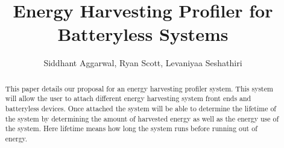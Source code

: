 \documentclass[10pt, sigconf ]{acmart}
\title{Energy Harvesting Profiler for Batteryless Systems}
\author{Siddhant Aggarwal, Ryan Scott, Levaniyaa Seshathiri}
\begin{document}
\begin{abstract}
 This paper details our proposal for an energy harvesting profiler system.
 This system will allow the user to attach different energy harvesting system front ends and batteryless devices.
 Once attached the system will be able to determine the lifetime of the system by determining the amount of harvested energy as well as the energy use of the system.
 Here lifetime means how long the system runs before running out of energy.
\end{abstract}

\maketitle




%




\end{document}
